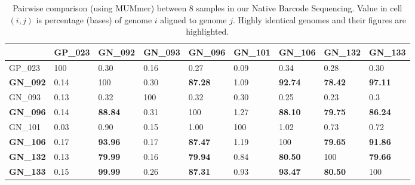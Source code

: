 

\begin{table}[!hp]
\centering
\caption[Pairwise comparison between samples in Native Barcode Sequencing]{Pairwise comparison (using MUMmer) between 8 samples in our Native Barcode Sequencing. Value in cell $(i,j)$ is percentage (bases) of genome $i$ aligned to genome $j$. Highly identical genomes and their figures are highlighted.} 
\label{supp_tab:dnadiff}
\begin{tabular}{lllllllll}
\hline
\toprule
& GP\_023 & \textbf{GN\_092} & GN\_093 & \textbf{GN\_096} & GN\_101 & \textbf{GN\_106} & \textbf{GN\_132} & \textbf{GN\_133} \\ \hline
\rowcolor{Gray} GP\_023 & 100 & 0.30 & 0.16 & 0.27 & 0.09 & 0.34 & 0.28 & 0.30 \\
\textbf{GN\_092} & 0.14 & 100  & 0.30 & \textbf{87.28} & 1.09 & \textbf{92.74} & \textbf{78.42} & \textbf{97.11} \\
\rowcolor{Gray} GN\_093 & 0.13 & 0.32  & 100 & 0.32 & 0.30 & 0.25 & 0.23 & 0.3  \\
\textbf{GN\_096} & 0.14 & \textbf{88.84}  & 0.31 & 100 & 1.27 & \textbf{88.10}  & \textbf{79.75}  & \textbf{86.24}  \\
\rowcolor{Gray} GN\_101 & 0.03 & 0.90 & 0.15 & 1.00 & 100 & 1.02 & 0.73  & 0.72 \\ \textbf{GN\_106} & 0.17  & \textbf{93.96} & 0.17 & \textbf{87.47} & 1.19  & 100 & \textbf{79.65} & \textbf{91.86}  \\
\rowcolor{Gray} \textbf{GN\_132} & 0.13 & \textbf{79.99}  & 0.16  & \textbf{79.94} & 0.84 & \textbf{80.50} & 100 & \textbf{79.66} \\
\textbf{GN\_133} & 0.15 & \textbf{99.99} & 0.26 & \textbf{87.31} & 0.93    & \textbf{93.47} & \textbf{80.50} & 100 \\ \hline
\end{tabular}
\end{table}

